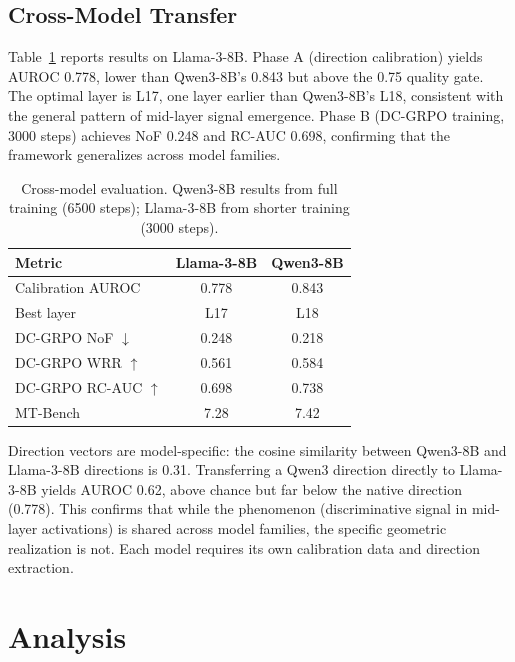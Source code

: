 \documentclass[11pt,a4paper]{article}
\begin{document}
\subsection{Cross-Model Transfer}
\label{sec:cross_model}

Table~\ref{tab:cross_model} reports results on Llama-3-8B. Phase A (direction calibration) yields AUROC 0.778, lower than Qwen3-8B's 0.843 but above the 0.75 quality gate. The optimal layer is L17, one layer earlier than Qwen3-8B's L18, consistent with the general pattern of mid-layer signal emergence. Phase B (DC-GRPO training, 3000 steps) achieves NoF 0.248 and RC-AUC 0.698, confirming that the framework generalizes across model families.

\begin{table}[t]
\centering
\caption{Cross-model evaluation. Qwen3-8B results from full training (6500 steps); Llama-3-8B from shorter training (3000 steps).}
\label{tab:cross_model}
\small
\begin{tabular}{lcc}
\toprule
Metric & Llama-3-8B & Qwen3-8B \\
\midrule
Calibration AUROC & 0.778 & 0.843 \\
Best layer & L17 & L18 \\
DC-GRPO NoF $\downarrow$ & 0.248 & 0.218 \\
DC-GRPO WRR $\uparrow$ & 0.561 & 0.584 \\
DC-GRPO RC-AUC $\uparrow$ & 0.698 & 0.738 \\
MT-Bench & 7.28 & 7.42 \\
\bottomrule
\end{tabular}
\end{table}

Direction vectors are model-specific: the cosine similarity between Qwen3-8B and Llama-3-8B directions is 0.31. Transferring a Qwen3 direction directly to Llama-3-8B yields AUROC 0.62, above chance but far below the native direction (0.778). This confirms that while the phenomenon (discriminative signal in mid-layer activations) is shared across model families, the specific geometric realization is not. Each model requires its own calibration data and direction extraction.

\section{Analysis}
\label{sec:analysis}
\end{document}
